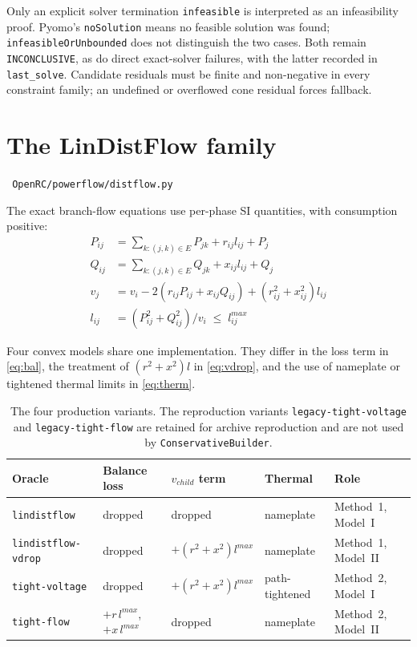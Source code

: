 \documentclass[11pt,a4paper]{report}
\newcommand{\code}[1]{\texttt{\small #1}}
\newcommand{\file}[1]{\texttt{\small\color{nbgrey} #1}}
\begin{document}
Only an explicit solver termination \code{infeasible} is interpreted as an
infeasibility proof. Pyomo's \code{noSolution} means no feasible solution was
found; \code{infeasibleOrUnbounded} does not distinguish the two cases. Both
remain \code{INCONCLUSIVE}, as do direct exact-solver failures, with the latter
recorded in \code{last\_solve}. Candidate residuals must be finite and
non-negative in every constraint family; an undefined or overflowed cone
residual forces fallback.

\section{The LinDistFlow family}

\file{OpenRC/powerflow/distflow.py}

The exact branch-flow equations use per-phase SI quantities, with consumption
positive:
\begin{align}
P_{ij} &= \textstyle\sum_{k:(j,k)\in E} P_{jk} + r_{ij} l_{ij} + P_j
  \label{eq:bal} \\
Q_{ij} &= \textstyle\sum_{k:(j,k)\in E} Q_{jk} + x_{ij} l_{ij} + Q_j \\
v_j &= v_i - 2 (r_{ij} P_{ij} + x_{ij} Q_{ij}) + (r_{ij}^2 + x_{ij}^2) l_{ij}
  \label{eq:vdrop} \\
l_{ij} &= (P_{ij}^2 + Q_{ij}^2) / v_i \;\le\; l^{max}_{ij}
  \label{eq:therm}
\end{align}

Four convex models share one implementation. They differ in the loss term in
\eqref{eq:bal}, the treatment of $(r^2+x^2)l$ in \eqref{eq:vdrop}, and the use
of nameplate or tightened thermal limits in \eqref{eq:therm}.

\begin{table}[h]
\centering\small
\caption{The four production variants. The reproduction variants
\code{legacy-tight-voltage} and \code{legacy-tight-flow} are retained for
archive reproduction and are not used by \code{ConservativeBuilder}.}
\begin{tabular}{@{}llllp{3.1cm}@{}}
\toprule
Oracle & Balance loss & $v_{child}$ term & Thermal & Role \\
\midrule
\code{lindistflow}       & dropped & dropped            & nameplate & Method~1, Model~I \\
\code{lindistflow-vdrop} & dropped & $+(r^2{+}x^2)l^{max}$ & nameplate & Method~1, Model~II \\
\code{tight-voltage}     & dropped & $+(r^2{+}x^2)l^{max}$ & path-tightened & Method~2, Model~I \\
\code{tight-flow}        & $+r\,l^{max}$, $+x\,l^{max}$ & dropped & nameplate & Method~2, Model~II \\
\bottomrule
\end{tabular}
\end{table}
\end{document}

